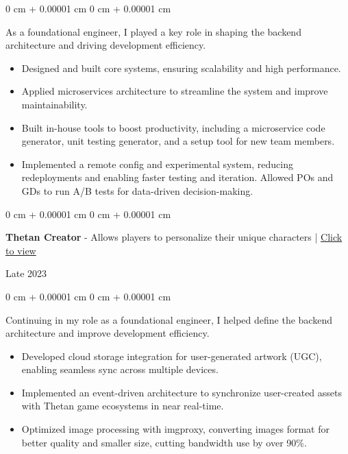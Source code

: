 \documentclass[10pt, letterpaper]{article}
\newenvironment{highlights}{
    \begin{itemize}[
        topsep=0.10 cm,
        parsep=0.10 cm,
        partopsep=0pt,
        itemsep=0pt,
        leftmargin=0 cm + 10pt
    ]
}{
    \end{itemize}
} %
\newenvironment{onecolentry}{
    \begin{adjustwidth}{
        0 cm + 0.00001 cm
    }{
        0 cm + 0.00001 cm
    }
}{
    \end{adjustwidth}
} %
\newenvironment{twocolentry}[2][]{
    \onecolentry
    \def\secondColumn{#2}
    \setcolumnwidth{\fill, 4.5 cm}
    \begin{paracol}{2}
}{
    \switchcolumn \raggedleft \secondColumn
    \end{paracol}
    \endonecolentry
} %
\begin{document}
    \vspace{0.10 cm}
    \begin{onecolentry}
        As a foundational engineer, I played a key role in shaping the backend architecture and driving development efficiency.
        \begin{highlights}
            \item Designed and built core systems, ensuring scalability and high performance.
            \item Applied microservices architecture to streamline the system and improve maintainability.
            \item Built in-house tools to boost productivity, including a microservice code generator, unit testing generator, and a setup tool for new team members.
            \item Implemented a remote config and experimental system, reducing redeployments and enabling faster testing and iteration. Allowed POs and GDs to run A/B tests for data-driven decision-making.
        \end{highlights}
    \end{onecolentry}

    \vspace{0.20 cm}
    \begin{twocolentry}{
        Late 2023
    }
        \textbf{Thetan Creator} - Allows players to personalize their unique characters | \href{https://thetancreator.com}{Click to view}
    \end{twocolentry}

    \vspace{0.10 cm}
    \begin{onecolentry}
        Continuing in my role as a foundational engineer, I helped define the backend architecture and improve development efficiency.
        \begin{highlights}
            \item Developed cloud storage integration for user-generated artwork (UGC), enabling seamless sync across multiple devices.
            \item Implemented an event-driven architecture to synchronize user-created assets with Thetan game ecosystems in near real-time.
            \item Optimized image processing with imgproxy, converting images format for better quality and smaller size, cutting bandwidth use by over 90\%.
        \end{highlights}
    \end{onecolentry}
\end{document}
